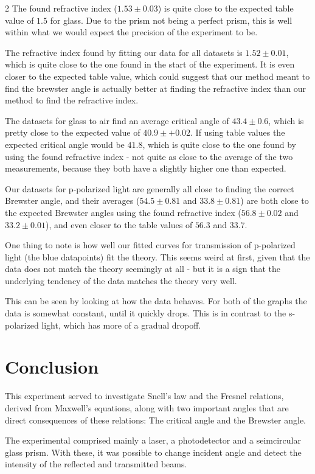 \documentclass[a4paper,oneside,article]{memoir}
\begin{document}
\begin{multicols}{2}
The found refractive index ($1.53\pm0.03$) is quite close to the expected table value of $1.5$ for glass. Due to the prism not being a perfect prism, this is well within what we would expect the precision of the experiment to be.

The refractive index found by fitting our data for all datasets is $1.52\pm0.01$, which is quite close to the one found in the start of the experiment. It is even closer to the expected table value, which could suggest that our method meant to find the brewster angle is actually better at finding the refractive index than our method to find the refractive index.

The datasets for glass to air find an average critical angle of $43.4\pm0.6$, which is pretty close to the expected value of $40.9\pm+0.02$. If using table values the expected critical angle would be $41.8$, which is quite close to the one found by using the found refractive index - not quite as close to the average of the two measurements, because they both have a slightly higher one than expected.

Our datasets for p-polarized light are generally all close to finding the correct Brewster angle, and their averages ($54.5\pm0.81$ and $33.8\pm0.81$) are both close to the expected Brewster angles using the found refractive index ($56.8\pm0.02$ and $33.2\pm0.01$), and even closer to the table values of $56.3$ and $33.7$.

One thing to note is how well our fitted curves for transmission of p-polarized light (the blue datapoints) fit the theory. This seems weird at first, given that the data does not match the theory seemingly at all - but it is a sign that the underlying tendency of the data matches the theory very well. 

This can be seen by looking at how the data behaves. For both of the graphs the data is somewhat constant, until it quickly drops. This is in contrast to the s-polarized light, which has more of a gradual dropoff.

\chapter{Conclusion}

This experiment served to investigate Snell's law and the Fresnel relations, derived from Maxwell's equations, along with two important angles that are direct consequences of these relations: The critical angle and the Brewster angle.

The experimental comprised mainly a laser, a photodetector and a seimcircular glass prism. With these, it was possible to change incident angle and detect the intensity of the reflected and transmitted beams.


\end{multicols}
\end{document}
